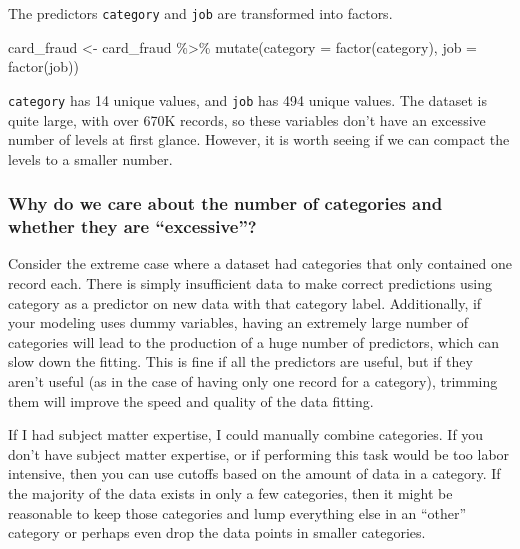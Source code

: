 \documentclass[
]{article}
\newenvironment{Shaded}{\begin{snugshade}}{\end{snugshade}}
\newcommand{\AttributeTok}[1]{\textcolor[rgb]{0.77,0.63,0.00}{#1}}
\newcommand{\FunctionTok}[1]{\textcolor[rgb]{0.00,0.00,0.00}{#1}}
\newcommand{\NormalTok}[1]{#1}
\newcommand{\OtherTok}[1]{\textcolor[rgb]{0.56,0.35,0.01}{#1}}
\newcommand{\SpecialCharTok}[1]{\textcolor[rgb]{0.00,0.00,0.00}{#1}}
\begin{document}
The predictors \texttt{category} and \texttt{job} are transformed into
factors.

\begin{Shaded}
\begin{Highlighting}[]
\NormalTok{card\_fraud }\OtherTok{\textless{}{-}}\NormalTok{ card\_fraud }\SpecialCharTok{\%\textgreater{}\%} 
  \FunctionTok{mutate}\NormalTok{(}\AttributeTok{category =} \FunctionTok{factor}\NormalTok{(category),}
         \AttributeTok{job =} \FunctionTok{factor}\NormalTok{(job))}
\end{Highlighting}
\end{Shaded}

\texttt{category} has 14 unique values, and \texttt{job} has 494 unique
values. The dataset is quite large, with over 670K records, so these
variables don't have an excessive number of levels at first glance.
However, it is worth seeing if we can compact the levels to a smaller
number.

\hypertarget{why-do-we-care-about-the-number-of-categories-and-whether-they-are-excessive}{%
\subsubsection{Why do we care about the number of categories and whether
they are
``excessive''?}\label{why-do-we-care-about-the-number-of-categories-and-whether-they-are-excessive}}

Consider the extreme case where a dataset had categories that only
contained one record each. There is simply insufficient data to make
correct predictions using category as a predictor on new data with that
category label. Additionally, if your modeling uses dummy variables,
having an extremely large number of categories will lead to the
production of a huge number of predictors, which can slow down the
fitting. This is fine if all the predictors are useful, but if they
aren't useful (as in the case of having only one record for a category),
trimming them will improve the speed and quality of the data fitting.

If I had subject matter expertise, I could manually combine categories.
If you don't have subject matter expertise, or if performing this task
would be too labor intensive, then you can use cutoffs based on the
amount of data in a category. If the majority of the data exists in only
a few categories, then it might be reasonable to keep those categories
and lump everything else in an ``other'' category or perhaps even drop
the data points in smaller categories.
\end{document}
